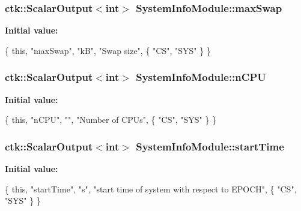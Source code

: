 \subsubsection[{\texorpdfstring{max\+Swap}{maxSwap}}]{\setlength{\rightskip}{0pt plus 5cm}ctk\+::\+Scalar\+Output$<$int$>$ System\+Info\+Module\+::max\+Swap}\hypertarget{classSystemInfoModule_a9eef2ed3d7ffb75ddcb2a0b5dc5b5ff2}{}\label{classSystemInfoModule_a9eef2ed3d7ffb75ddcb2a0b5dc5b5ff2}
{\bfseries Initial value\+:}
\begin{DoxyCode}
\{ \textcolor{keyword}{this}, \textcolor{stringliteral}{"maxSwap"}, \textcolor{stringliteral}{"kB"}, \textcolor{stringliteral}{"Swap size"},
    \{ \textcolor{stringliteral}{"CS"}, \textcolor{stringliteral}{"SYS"} \} \}
\end{DoxyCode}
\subsubsection[{\texorpdfstring{n\+C\+PU}{nCPU}}]{\setlength{\rightskip}{0pt plus 5cm}ctk\+::\+Scalar\+Output$<$int$>$ System\+Info\+Module\+::n\+C\+PU}\hypertarget{classSystemInfoModule_a4eb6a36a94e8415db8cf38d8a95354ff}{}\label{classSystemInfoModule_a4eb6a36a94e8415db8cf38d8a95354ff}
{\bfseries Initial value\+:}
\begin{DoxyCode}
\{ \textcolor{keyword}{this}, \textcolor{stringliteral}{"nCPU"}, \textcolor{stringliteral}{""}, \textcolor{stringliteral}{"Number of CPUs"},
    \{ \textcolor{stringliteral}{"CS"}, \textcolor{stringliteral}{"SYS"} \} \}
\end{DoxyCode}
\subsubsection[{\texorpdfstring{start\+Time}{startTime}}]{\setlength{\rightskip}{0pt plus 5cm}ctk\+::\+Scalar\+Output$<$int$>$ System\+Info\+Module\+::start\+Time}\hypertarget{classSystemInfoModule_a9caec7b46d3c1a9b39407592ab4858d1}{}\label{classSystemInfoModule_a9caec7b46d3c1a9b39407592ab4858d1}
{\bfseries Initial value\+:}
\begin{DoxyCode}
\{ \textcolor{keyword}{this}, \textcolor{stringliteral}{"startTime"}, \textcolor{stringliteral}{"s"}, \textcolor{stringliteral}{"start time of system with respect to EPOCH"},
      \{ \textcolor{stringliteral}{"CS"}, \textcolor{stringliteral}{"SYS"} \} \}
\end{DoxyCode}
